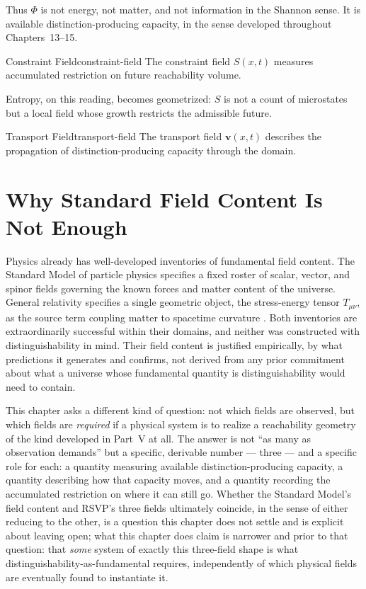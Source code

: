\documentclass[12pt,twoside,openright]{book}
\begin{document}
Thus $\Phi$ is not energy, not matter, and not information
in the Shannon sense. It is available
distinction-producing capacity, in the sense developed
throughout Chapters~13--15.

\begin{definition}{Constraint Field}{constraint-field}
  The constraint field $S(x,t)$ measures accumulated
  restriction on future reachability volume.
\end{definition}

Entropy, on this reading, becomes geometrized: $S$ is not
a count of microstates but a local field whose growth
restricts the admissible future.

\begin{definition}{Transport Field}{transport-field}
  The transport field $\mathbf{v}(x,t)$ describes the
  propagation of distinction-producing capacity through
  the domain.
\end{definition}

\section{Why Standard Field Content Is Not Enough}
\label{sec:ch16-why-standard-fields}

Physics already has well-developed inventories of fundamental
field content. The Standard Model of particle physics
specifies a fixed roster of scalar, vector, and spinor fields
governing the known forces and matter content of the
universe. General relativity specifies a single geometric
object, the stress-energy tensor $T_{\mu\nu}$, as the source
term coupling matter to spacetime curvature
\parencite{misner1973}. Both inventories are extraordinarily
successful within their domains, and neither was constructed
with distinguishability in mind. Their field content is
justified empirically, by what predictions it generates and
confirms, not derived from any prior commitment about what a
universe whose fundamental quantity is distinguishability
would need to contain.

This chapter asks a different kind of question: not which
fields are observed, but which fields are \emph{required} if
a physical system is to realize a reachability geometry of
the kind developed in Part~V at all. The answer is not ``as
many as observation demands'' but a specific, derivable
number --- three --- and a specific role for each: a quantity
measuring available distinction-producing capacity, a
quantity describing how that capacity moves, and a quantity
recording the accumulated restriction on where it can still
go. Whether the Standard Model's field content and RSVP's
three fields ultimately coincide, in the sense of either
reducing to the other, is a question this chapter does not
settle and is explicit about leaving open; what this chapter
does claim is narrower and prior to that question: that
\emph{some} system of exactly this three-field shape is what
distinguishability-as-fundamental requires, independently of
which physical fields are eventually found to instantiate it.
\end{document}
